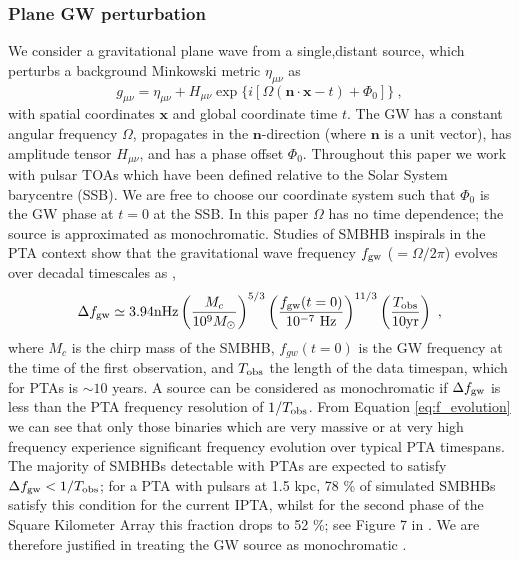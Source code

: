 \documentclass[fleqn,usenatbib,useAMS]{mnras}
\begin{document}
\subsubsection{Plane GW perturbation}
We consider a gravitational plane wave from a single,distant source, which perturbs a background Minkowski metric $\eta_{\mu \nu}$ as
\begin{equation}
	g_{\mu \nu} = \eta_{\mu \nu} + H_{\mu \nu} \exp{ \{ i[\Omega(\boldsymbol{n} \cdot \boldsymbol{x} - t) + \Phi_0] \} } \ ,
\end{equation}
with spatial coordinates $\boldsymbol{x}$ and global coordinate time $t$. The GW has a constant angular frequency $\Omega$, propagates in the $\boldsymbol{n}$-direction (where $\boldsymbol{n}$ is a unit vector), has amplitude tensor $H_{\mu \nu}$, and has a phase offset  $\Phi_0$. Throughout this paper we work with pulsar TOAs which have been defined relative to the Solar System barycentre (SSB). We are free to choose our coordinate system such that $\Phi_0$ is the GW phase at $t=0$ at the SSB. In this paper $\Omega$ has no time dependence; the source is approximated as monochromatic. Studies of SMBHB inspirals in the PTA context show that the gravitational wave frequency $f_{\rm gw}$ ($=\Omega / 2 \pi $) evolves over decadal timescales as \citep[e.g.][]{Zhu10},
\begin{equation}
	\Delta f_{\rm gw} \simeq 3.94 \mathrm{nHz}\left(\frac{M_c}{10^9 M_{\odot}}\right)^{5 / 3}\left(\frac{f_{\rm gw}(t=0)}{10^{-7} \mathrm{~Hz}}\right)^{11 / 3}\left(\frac{T_{\mathrm{obs}}}{10 \mathrm{yr}}\right) \ ,
	\label{eq:f_evolution}
\end{equation}
where $M_c$ is the chirp mass of the SMBHB, $f_{gw}(t=0)$ is the GW frequency at the time of the first observation, and $T_{\rm obs}$ the length of the data timespan, which for PTAs is $\sim 10$ years. A source can be considered as monochromatic if $\Delta f_{\rm gw}$ is less than the PTA frequency resolution of $1/T_{\rm obs}$. From Equation \eqref{eq:f_evolution} we can see that only those binaries which are very massive or at very high frequency experience significant frequency evolution over typical PTA timespans. The majority of SMBHBs detectable with PTAs are expected to satisfy $\Delta f_{\rm gw} < 1/T_{\rm obs}$; for a PTA with pulsars at 1.5 kpc, 78 \% of simulated SMBHBs satisfy this condition for the current IPTA, whilst for the second phase of the Square Kilometer Array this fraction drops to 52 \%; see Figure 7 in  \cite{Rosado10.1093/mnras/stv1098}. We are therefore justified in treating the GW source as monochromatic \citep{Sesana10,Sesana2010,Ellis2012ApJ}. \newline 
\end{document}
